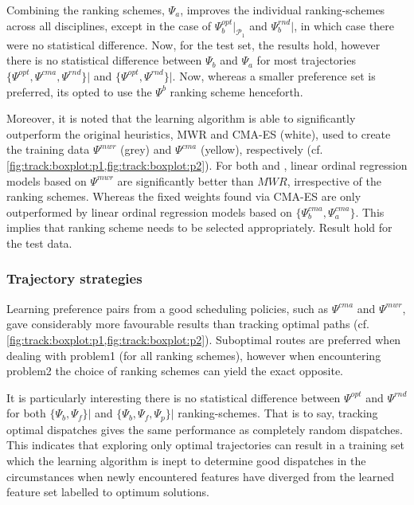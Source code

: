 Combining the ranking schemes, $\Psi_a$, improves the individual 
ranking-schemes across all disciplines, except in the case of 
$\Psi_b^{opt}\big|_{\mathcal{P_1}}$ and $\Psi_b^{rnd}\big|$\!, in 
which 
case there were no statistical difference. Now, for the test set, the results 
hold, however there is no statistical difference between $\Psi_b$ and $\Psi_a$ 
for most trajectories $\{\Psi^{opt},\Psi^{cma},\Psi^{rnd}\}\big|$\! 
and  $\{\Psi^{opt},\Psi^{rnd}\}\big|$\!. Now, whereas a smaller 
preference set is preferred, its opted to use the $\Psi^{b}$ ranking scheme 
henceforth. 

Moreover, it is noted that the learning algorithm is able to significantly 
outperform the original heuristics, MWR and CMA-ES (white), used to create the 
training data $\Psi^{mwr}$ (grey) and $\Psi^{cma}$ (yellow), respectively (cf. 
\cref{fig:track:boxplot:p1,fig:track:boxplot:p2}). For both  and 
, linear ordinal regression models based on $\Psi^{mwr}$ are 
significantly better than $MWR$, irrespective of the ranking schemes. Whereas 
the fixed weights found via CMA-ES are only outperformed by linear ordinal 
regression models based on $\{\Psi_b^{cma},\Psi_a^{cma}\}$. This implies that 
ranking scheme needs to be selected appropriately. Result hold for the test 
data.

\subsubsection{Trajectory strategies}
Learning preference pairs from a good scheduling policies, such as $\Psi^{cma}$ 
and $\Psi^{mwr}$, gave considerably more favourable results than tracking 
optimal paths (cf. \cref{fig:track:boxplot:p1,fig:track:boxplot:p2}). 
Suboptimal routes are preferred when dealing with problem{1} (for all ranking 
schemes), however when encountering problem{2} the choice of ranking schemes 
can yield the exact opposite.

It is particularly interesting there is no statistical difference between 
$\Psi^{opt}$ and $\Psi^{rnd}$ for both $\{\Psi_{b},\Psi_{f}\}\big|$ 
and 
$\{\Psi_b,\Psi_f,\Psi_p\}\big|$ ranking-schemes. That is to say, 
tracking 
optimal dispatches gives the same performance as completely random dispatches. 
This indicates that exploring only optimal trajectories can result in a 
training set which the learning algorithm is inept to determine good dispatches 
in the circumstances when newly encountered features have diverged from the 
learned feature set labelled to optimum solutions. 


